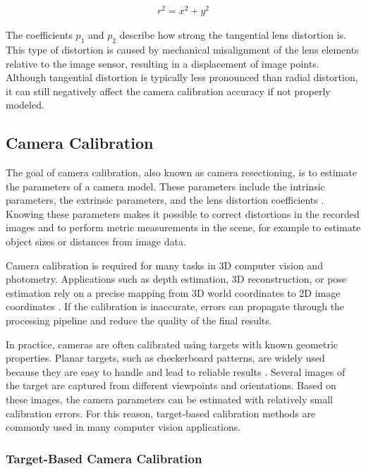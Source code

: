 \documentclass[12pt]{scrartcl}
\begin{document}
\begin{align}
r^2 = x^2 + y^2
\label{eq:tangential_r}
\end{align}

The coefficients $p_1$ and $p_2$ describe how strong the tangential lens distortion is. This type of distortion is caused by mechanical misalignment of the lens elements relative to the image sensor, resulting in a displacement of image points. Although tangential distortion is typically less pronounced than radial distortion, it can still negatively affect the camera calibration accuracy if not properly modeled.

\subsection{Camera Calibration}

The goal of camera calibration, also known as camera resectioning, is to estimate the parameters of a camera model. These parameters include the intrinsic parameters, the extrinsic parameters, and the lens distortion coefficients \cite{MathWorksCameraCalibration}. Knowing these parameters makes it possible to correct distortions in the recorded images and to perform metric measurements in the scene, for example to estimate object sizes or distances from image data.
\newline

Camera calibration is required for many tasks in 3D computer vision and photometry. Applications such as depth estimation, 3D reconstruction, or pose estimation rely on a precise mapping from 3D world coordinates to 2D image coordinates \cite{song2025camera}. If the calibration is inaccurate, errors can propagate through the processing pipeline and reduce the quality of the final results.
\newline

In practice, cameras are often calibrated using targets with known geometric properties. Planar targets, such as checkerboard patterns, are widely used because they are easy to handle and lead to reliable results \cite{888718}. Several images of the target are captured from different viewpoints and orientations. Based on these images, the camera parameters can be estimated with relatively small calibration errors. For this reason, target-based calibration methods are commonly used in many computer vision applications.

\subsubsection{Target-Based Camera Calibration}
\end{document}
